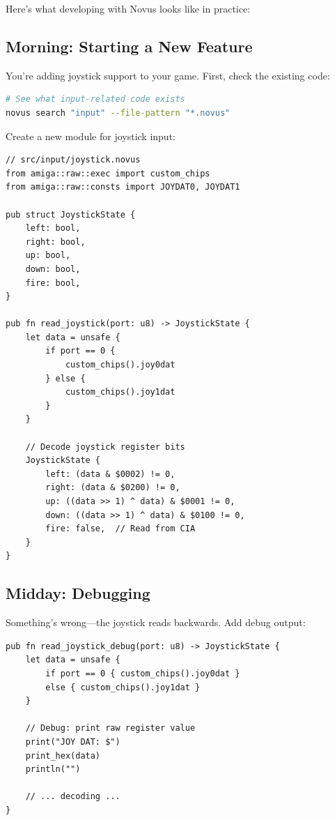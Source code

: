 Here's what developing with Novus looks like in practice:

\subsection{Morning: Starting a New Feature}

You're adding joystick support to your game. First, check the existing code:

\begin{lstlisting}[language=bash]
# See what input-related code exists
novus search "input" --file-pattern "*.novus"
\end{lstlisting}

Create a new module for joystick input:

\begin{lstlisting}
// src/input/joystick.novus
from amiga::raw::exec import custom_chips
from amiga::raw::consts import JOYDAT0, JOYDAT1

pub struct JoystickState {
    left: bool,
    right: bool,
    up: bool,
    down: bool,
    fire: bool,
}

pub fn read_joystick(port: u8) -> JoystickState {
    let data = unsafe {
        if port == 0 {
            custom_chips().joy0dat
        } else {
            custom_chips().joy1dat
        }
    }

    // Decode joystick register bits
    JoystickState {
        left: (data & $0002) != 0,
        right: (data & $0200) != 0,
        up: ((data >> 1) ^ data) & $0001 != 0,
        down: ((data >> 1) ^ data) & $0100 != 0,
        fire: false,  // Read from CIA
    }
}
\end{lstlisting}

\subsection{Midday: Debugging}

Something's wrong---the joystick reads backwards. Add debug output:

\begin{lstlisting}
pub fn read_joystick_debug(port: u8) -> JoystickState {
    let data = unsafe {
        if port == 0 { custom_chips().joy0dat }
        else { custom_chips().joy1dat }
    }

    // Debug: print raw register value
    print("JOY DAT: $")
    print_hex(data)
    println("")

    // ... decoding ...
}
\end{lstlisting}

